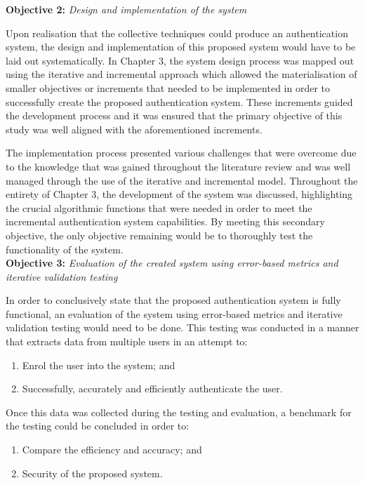 \textbf{Objective 2:} \textit{Design and implementation of the system}

Upon realisation that the collective techniques could produce an authentication system, the design and implementation of this proposed system would have to be laid out systematically. In Chapter 3, the system design process was mapped out using the iterative and incremental approach which allowed the materialisation of smaller objectives or increments that needed to be implemented in order to successfully create the proposed authentication system. These increments guided the development process and it was ensured that the primary objective of this study was well aligned with the aforementioned increments. 

The implementation process presented various challenges that were overcome due to the knowledge that was gained throughout the literature review and was well managed through the use of the iterative and incremental model. Throughout the entirety of Chapter 3, the development of the system was discussed, highlighting the crucial algorithmic functions that were needed in order to meet the incremental authentication system capabilities. By meeting this secondary objective, the only objective remaining would be to thoroughly test the functionality of the system.\\


\textbf{Objective 3:} \textit{Evaluation of the created system using error-based metrics and iterative validation testing}


In order to conclusively state that the proposed authentication system is fully functional, an evaluation of the system using error-based metrics and iterative validation testing would need to be done. This testing was conducted in a manner that extracts data from multiple users in an attempt to:

\begin{enumerate}[label=\roman*.]
    \item Enrol the user into the system; and
    \item Successfully, accurately and efficiently authenticate the user.
\end{enumerate}

Once this data was collected during the testing and evaluation, a benchmark for the testing could be concluded in order to: 

\begin{enumerate}[label=\roman*.]
    \item Compare the efficiency and accuracy; and 
    \item Security of the proposed system.
\end{enumerate}

